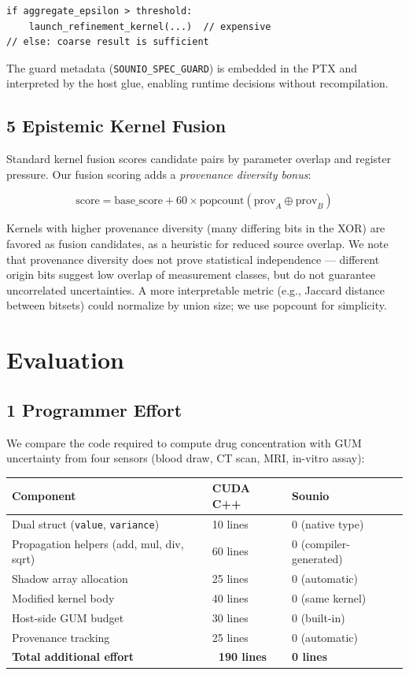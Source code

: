 \documentclass[11pt]{article}
\begin{document}
{{\begin{lstlisting}[basicstyle=\ttfamily\small]
if aggregate_epsilon > threshold:
    launch_refinement_kernel(...)  // expensive
// else: coarse result is sufficient
\end{lstlisting}

The guard metadata (\texttt{SOUNIO_SPEC_GUARD}) is embedded in the PTX and interpreted by the host glue, enabling runtime decisions without recompilation.

\subsection{5 Epistemic Kernel Fusion}

Standard kernel fusion scores candidate pairs by parameter overlap and register pressure. Our fusion scoring adds a \emph{provenance diversity bonus}:

\[\text{score} = \text{base\_score} + 60 \times \text{popcount}(\text{prov}_A \oplus \text{prov}_B)\]

Kernels with higher provenance diversity (many differing bits in the XOR) are favored as fusion candidates, as a heuristic for reduced source overlap. We note that provenance diversity does not prove statistical independence --- different origin bits suggest low overlap of measurement classes, but do not guarantee uncorrelated uncertainties. A more interpretable metric (e.g., Jaccard distance between bitsets) could normalize by union size; we use popcount for simplicity.


\section{Evaluation}

\subsection{1 Programmer Effort}

We compare the code required to compute drug concentration with GUM uncertainty from four sensors (blood draw, CT scan, MRI, in-vitro assay):

\begin{table}[t]\centering
\begin{tabular}{lll}
\toprule
Component & CUDA C++ & Sounio \\
\midrule
Dual struct (\texttt{value}, \texttt{variance}) & 10 lines & 0 (native type) \\
Propagation helpers (add, mul, div, sqrt) & 60 lines & 0 (compiler-generated) \\
Shadow array allocation & 25 lines & 0 (automatic) \\
Modified kernel body & 40 lines & 0 (same kernel) \\
Host-side GUM budget & 30 lines & 0 (built-in) \\
Provenance tracking & 25 lines & 0 (automatic) \\
\textbf{Total additional effort} & \textbf{~190 lines} & \textbf{0 lines} \\
\bottomrule
\end{tabular}
\end{table}

}}
\end{document}
